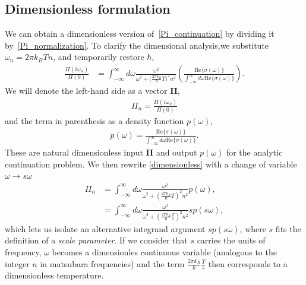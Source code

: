 \documentclass[notitlepage,11pt,nofootinbib]{revtex4-1}
\renewcommand{\vec}[1]{\bm{#1}}
\begin{document}
\subsection{Dimensionless formulation}
\label{sec_dimensionless}
We can obtain a dimensionless version of~\eqref{Pi_continuation} by dividing it by~\eqref{Pi_normalization}. To clarify the dimensional analysis,we substitute $\omega_n = 2\pi k_BTn$, and temporarily restore $\hbar$,
\begin{align}
\frac{\Pi(i\omega_n)}{\Pi(0)}
&=
\int_{-\infty}^{\infty} d\omega \frac{\omega^2}{
\omega^2+
\big(\frac{2\pi k_B}{\hbar}T\big)
^2n^2
}\left(
\frac{\text{Re}\{ \sigma(\omega) \}}
{\int_{-\infty}^{\infty} d\omega \text{Re}\{ \sigma(\omega) \}}
\right).
\label{dimensionless}
\end{align}
We will denote the left-hand side as a vector $\vec \Pi$, \begin{align}
\Pi_n = \frac{\Pi(i\omega_n)}{\Pi(0)} 
\end{align}
and the term in parenthesis as a density function $p(\omega)$,
\begin{align}
p(\omega) =
\frac{\text{Re}\{ \sigma(\omega) \}}
{\int_{-\infty}^{\infty} d\omega \text{Re}\{ \sigma(\omega) \}}.
\label{eq_def_density}
\end{align}
These are natural dimensionless input $\vec\Pi$ and output $p(\omega)$ for the analytic continuation problem. We then rewrite \eqref{dimensionless} with a change of variable $\omega\rightarrow s\omega$
\begin{align}
\Pi_n
&=
\int_{-\infty}^{\infty} d\omega \frac{\omega^2}{\omega^2 + \left(\frac{2\pi k_B}{\hbar}T\right)^2n^2}
p(\omega),
\label{dimensionless_with_p1}
\\
&=
\int_{-\infty}^{\infty} d\omega \frac{\omega^2}{\omega^2 + \left(\frac{2\pi k_B}{\hbar}\frac{T}{s}\right)^2n^2}
sp(s\omega),
\label{dimensionless_with_p2}
\end{align}
which lets us isolate an alternative integrand argument $sp(s\omega)$, where $s$ fits the definition of a \emph{scale parameter}.
If we consider that $s$ carries the units of frequency, $\omega$ becomes a dimensionles continuous variable (analogous to the integer $n$ in matsubara frequencies) and the term $\frac{2\pi k_B}{\hbar}\frac{T}{s}$ then corresponds to a dimensionless temperature.
\end{document}
